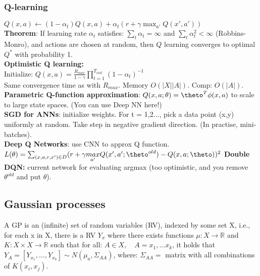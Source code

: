 \subsubsection{Q-learning}
$Q(x,a) \leftarrow (1-\alpha_t)Q(x,a) + \alpha_t(r+\gamma \max_{a'}Q(x', a'))$\\
\textbf{Theorem}: If learning rate $\alpha_t$ satisfies: $\sum_t \alpha_t=\infty$ and $\sum_t \alpha_t^2 < \infty$ (Robbins-Monro), and actions are chosen at random, then $Q$ learning converges to optimal $Q^*$ with probability 1.\\
\textbf{Optimistic Q learning:}\\
Initialize: $Q(x,a)=\frac{R_{max}}{1-\gamma}\prod_{t=1}^{T_{init}}(1-\alpha_t)^{-1}$\\
Same convergence time as with $R_{max}$. Memory $O(|X||A|)$. Comp: $O(|A|)$.\\
\textbf{Parametric Q-function approximation}: $Q(x,a;\theta)=\theto^T\phi (x,a)$ to scale to large state spaces. (You can use Deep NN here!)\\
\textbf{SGD for ANNs}: initialize weights. For t = 1,2..., pick a data point (x,y) uniformly at random. Take step in negative gradient direction. (In practise, mini-batches).\\
\textbf{Deep Q Networks}: use CNN to approx Q function.
$ L(\theta)=\sum_{(x,a,r,x')\in D}(r+\gamma\underset{a'}{max}Q(x',a';\theto^{old})-Q(x,a;\theto))^2$ \textbf{Double DQN:} current network for evaluating argmax (too optimistic, and you remove $\theta^{old}$ and put $\theta$).

\subsection{Gaussian processes}
A GP is an (infinite) set of random variables (RV), indexed by some set X, i.e., for each x in X, there is a RV $Y_x$ where there exists functions $\mu : X \rightarrow \mathbb{R}$ and $K: X \times X \rightarrow \mathbb{R}$ such that for all: $A \in X, \quad A={x_1,...x_k}$, it holds that $Y_A=[Y_{x_1},...,Y_{x_k}] \sim N(\mu_a, \Sigma_{AA})$, where: $\Sigma_{AA} =$ matrix with all combinations of $K(x_i, x_j)$.

